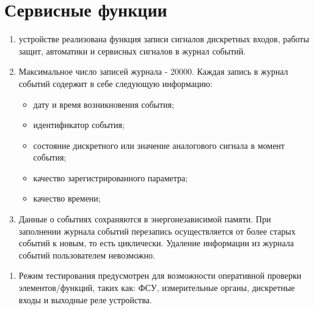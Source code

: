 \color{unimain}\section[Сервисные функции]{Сервисные функции}\label{sec:servfuncs}
\color{black}



\color{black}

\begin{enumerate}

\item
устройстве реализована функция записи сигналов дискретных входов, работы защит, автоматики и сервисных сигналов в журнал событий.
\item
Максимальное число записей журнала - 20000. Каждая запись в журнал событий содержит в себе следующую информацию:
\begin{itemize}
    \item дату и время возникновения события;
    \item идентификатор события;
    \item состояние дискретного или значение аналогового сигнала в момент события;
    \item качество зарегистрированного параметра;
    \item качество времени;
\end{itemize}
\item
Данные о событиях сохраняются в энергонезависимой памяти. При заполнении журнала событий перезапись осуществляется от более старых событий к новым, то есть циклически. Удаление информации из журнала событий пользователем невозможно.

\end{enumerate}

\color{black}

\begin{enumerate}

\item
Режим тестирования предусмотрен для возможности оперативной проверки элементов/функций, таких как: ФСУ, измерительные органы, дискретные входы и выходные реле устройства.

\end{enumerate}

